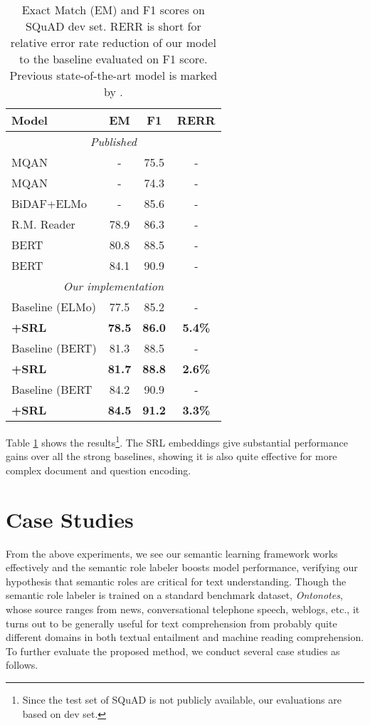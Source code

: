 \documentclass[11pt]{article}
\begin{document}
\begin{table}
	\centering
	
	{
		\begin{tabular}{l c c c}
			\hline
			
			\hline
			\textbf{Model}& \textbf{EM}& \textbf{F1} & \textbf{RERR} \\
			\hline
			\multicolumn{4}{c}{\emph{Published}} \\
			MQAN & - & 75.5 &- \\
			MQAN & - & 74.3 &- \\
			BiDAF+ELMo & - &85.6 & -\\
			R.M. Reader & 78.9 & 86.3 & - \\
			BERT & 80.8 & 88.5 & - \\
			BERT & 84.1 & 90.9 & - \\
			\hline
			\multicolumn{4}{c}{\emph{Our implementation}} \\
			Baseline (ELMo)& 77.5 & 85.2 & -\\
			\textbf{+SRL} &  \textbf{78.5} & \textbf{86.0} & \textbf{5.4\%}\\
			\hline
			Baseline (BERT)  &  81.3 &  88.5 & -\\
			\textbf{+SRL} &  \textbf{81.7} & \textbf{88.8} & \textbf{ 2.6\%}\\
			\hline
			Baseline (BERT  & 84.2  & 90.9 & -\\
			\textbf{+SRL} &  \textbf{84.5} & \textbf{91.2} & \textbf{3.3\%}\\
			\hline
		\end{tabular}
	}
	
	\caption{\label{tab:squad} Exact Match (EM) and F1 scores on SQuAD dev set. RERR is short for relative error rate reduction of our model to the baseline evaluated on F1 score. Previous state-of-the-art model is marked by .}
\end{table}

Table \ref{tab:squad} shows the results\footnote{Since the test set of SQuAD is not publicly available, our evaluations are based on dev set.}. The SRL embeddings give substantial performance gains over all the strong baselines, showing it is also quite effective for more complex document and question encoding.


\section{Case Studies}
From the above experiments, we see our semantic learning framework works effectively and the semantic role labeler boosts model performance, verifying our hypothesis that semantic roles are critical for text understanding. Though the semantic role labeler is trained on a standard benchmark dataset, \emph{Ontonotes}, whose source ranges from news, conversational telephone speech, weblogs, etc., it turns out to be generally useful for text comprehension from probably quite different domains in both textual entailment and machine reading comprehension. To further evaluate the proposed method, we conduct several case studies as follows.
\end{document}
